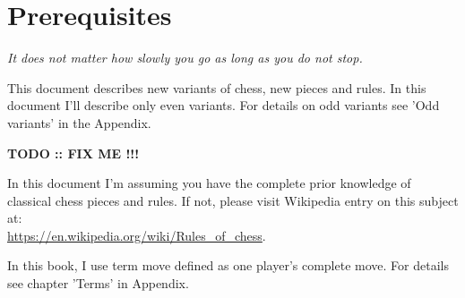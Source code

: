 
\chapter*{Prerequisites}

\begin{flushright}
\parbox{0.7\textwidth}{
\emph{It does not matter how slowly you go as long as you do not stop. \\
 } }
\end{flushright}

\noindent
This document describes new variants of chess, new pieces and rules. In this document I'll describe only
even variants. For details on odd variants see 'Odd variants' in the Appendix.

\textbf{\huge{TODO :: FIX ME !!!}} %

In this document I'm assuming you have the complete prior knowledge of classical chess pieces and rules.
If not, please visit Wikipedia entry on this subject at: \\
\href{https://en.wikipedia.org/wiki/Rules\_of\_chess}{https://en.wikipedia.org/wiki/Rules\_of\_chess}.

In this book, I use term move defined as one player's complete move. For details see chapter 'Terms' in
Appendix.

\clearpage
